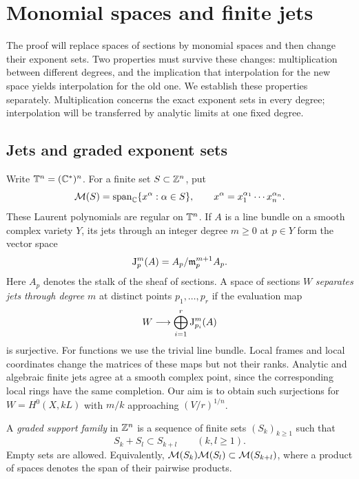 \section{Monomial spaces and finite jets}
\label{sec:transfers}

The proof will replace spaces of sections by monomial spaces and then change
their exponent sets. Two properties must survive these changes: multiplication
between different degrees, and the implication that interpolation for the new
space yields interpolation for the old one. We establish these properties
separately. Multiplication concerns the exact exponent sets in every degree;
interpolation will be transferred by analytic limits at one fixed degree.

\subsection{Jets and graded exponent sets}

Write $\mathbb T^n=(\mathbb C^*)^n$. For a finite set $S\subset\mathbb Z^n$, put
\[
 \mathcal M(S)=\operatorname{span}_{\mathbb C}\{x^\alpha:\alpha\in S\},
 \qquad x^\alpha=x_1^{\alpha_1}\cdots x_n^{\alpha_n}.
\]
These Laurent polynomials are regular on $\mathbb T^n$. If $A$ is a line bundle
on a smooth complex variety $Y$, its jets through an integer degree $m\geq0$ at $p\in Y$
form the vector space
\[
 \mathrm J_p^m(A)
 =A_p/\mathfrak m_p^{m+1}A_p.
\]
Here $A_p$ denotes the stalk of the sheaf of sections. A space of sections
$W$ \emph{separates jets through degree $m$} at distinct points
$p_1,\ldots,p_r$ if the evaluation map
\[
 W\longrightarrow\bigoplus_{i=1}^r\mathrm J_{p_i}^m(A)
\]
is surjective. For functions we use the trivial line bundle. Local frames and
local coordinates change the matrices of these maps but not their ranks.
Analytic and algebraic finite jets agree at a smooth complex point, since
the corresponding local rings have the same completion.
Our aim is to obtain such surjections for $W=H^0(X,kL)$ with $m/k$
approaching $(V/r)^{1/n}$.

\begin{definition}\label{def:graded-support}
A \emph{graded support family} in $\mathbb Z^n$ is a sequence of finite sets
$(S_k)_{k\geq1}$ such that
\begin{equation}\label{eq:graded-support}
 S_k+S_l\subset S_{k+l}\qquad(k,l\geq1).
\end{equation}
Empty sets are allowed. Equivalently,
$\mathcal M(S_k)\mathcal M(S_l)\subset\mathcal M(S_{k+l})$, where a product of spaces denotes the
span of their pairwise products.
\end{definition}

